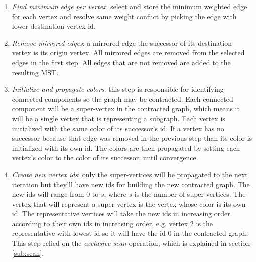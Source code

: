 \begin{enumerate}
	\item \emph{Find minimum edge per vertex}: select and store the minimum weighted edge for each vertex and resolve same weight conflict by picking the edge with lower destination vertex id.
	\item \emph{Remove mirrored edges}: a mirrored edge the successor of its destination vertex is its origin vertex.
	All mirrored edges are removed from the selected edges in the first step. All edges that are not removed are added to the resulting MST.

	\item \emph{Initialize and propagate colors}: this step is responsible for identifying connected components so the graph may be contracted.
	Each connected component will be a super-vertex in the contracted graph, which means it will be a single vertex that is representing a subgraph.
	Each vertex is initialized with the same color of its successor's id.
	If a vertex has no successor because that edge was removed in the previous step than its color is initialized with its own id.
	The colors are then propagated by setting each vertex's color to the color of its successor, until convergence.

	\item \emph{Create new vertex ids}: only the super-vertices will be propagated to the next iteration but they'll have new ids for building the new contracted graph.
	The new ids will range from $0$ to $s$, where $s$ is the number of super-vertices.
	The vertex that will represent a super-vertex is the vertex whose color is its own id.
	The representative vertices will take the new ids in increasing order according to their own ids in increasing order, e.g. vertex $2$ is the representative with lowest id so it will have the id $0$ in the contracted graph.
	This step relied on the \emph{exclusive scan} operation, which is explained in section \ref{sub:scan}.


\end{enumerate}
